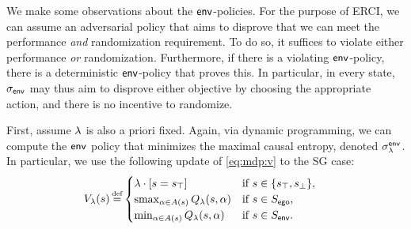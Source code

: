 \color{black}
We make some observations about the $\mathsf{env}$-policies. 
For the purpose of ERCI, we can assume an adversarial policy that aims to disprove that we can meet the performance \emph{and} randomization requirement. 
To do so, it suffices to violate either performance \emph{or} randomization. 
Furthermore, if there is a violating $\mathsf{env}$-policy, there is a deterministic $\mathsf{env}$-policy that proves this. 
In particular, in every state,  ${\sigma_{\mathsf{env}}}$ may thus aim to disprove either objective by choosing the appropriate action, and there is no incentive to randomize.


First, assume $\lambda$ is also a priori fixed.  
Again, via dynamic programming, we can compute the
$\mathsf{env}$ policy that minimizes the maximal causal entropy, denoted $\sigma_\lambda^{\mathsf{env}}$.
In particular, we use the following update of \eqref{eq:mdp:v} to the SG case:
 \begin{align}
   & V_\rat(s) \eqdef  \begin{cases}
     \lambda  \cdot \indicator{s = \target} & \text{if }s \in \{ \target, \sink \},\\
     \smoothmax_{\act \in \EnAct(s)}{  Q_\rat(s,\act) } & \text{if } s \in S_\pOne, \\
     \min_{\act \in \EnAct(s)}{  Q_\rat(s,\act) } &  \text{if } s \in S_\pTwo.
   \end{cases}
 \end{align}

